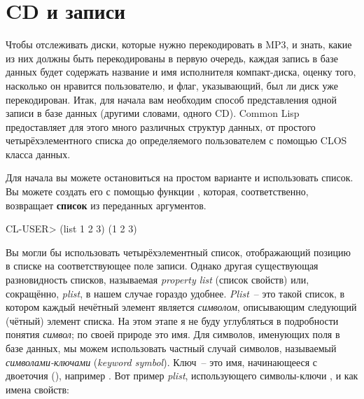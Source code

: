 \section{CD и записи}

Чтобы отслеживать диски, которые нужно перекодировать в MP3, и знать, какие из них должны
быть перекодированы в первую очередь, каждая запись в базе данных будет содержать название
и имя исполнителя компакт-диска, оценку того, насколько он нравится пользователю, и флаг,
указывающий, был ли диск уже перекодирован. Итак, для начала вам необходим способ
представления одной записи в базе данных (другими словами, одного CD). Common Lisp
предоставляет для этого много различных структур данных, от простого четырёхэлементного
списка до определяемого пользователем с помощью CLOS класса данных.

Для начала вы можете остановиться на простом варианте и использовать список. Вы можете
создать его с помощью функции , которая, соответственно, возвращает
\textbf{список}  из
переданных аргументов.

\begin{myverb}
  CL-USER> (list 1 2 3)
   (1 2 3)
\end{myverb}

Вы могли бы использовать четырёхэлементный список, отображающий позицию в списке на
соответствующее поле записи. Однако другая существующая разновидность списков, называемая
\textit{property list} (список свойств) или, сокращённо, \textit{plist}, в нашем случае
гораздо удобнее. \textit{Plist}~-- это такой список, в котором каждый нечётный элемент
является \textit{символом}, описывающим следующий (чётный) элемент списка. На этом этапе я
не буду углубляться в подробности понятия \textit{символ}; по своей природе это имя. Для
символов, именующих поля в базе данных, мы можем использовать частный случай символов,
называемый \textit{символами-ключами} (\textit{keyword symbol}). Ключ~-- это имя,
начинающееся с двоеточия (\code{:}), например . Вот пример \textit{plist}, использующего символы-ключи ,
 и  как имена свойств:

